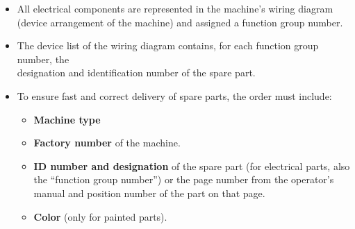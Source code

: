 \begin{itemize}
    \item All electrical components are represented in the machine’s wiring diagram  
          (device arrangement of the machine) and assigned a function group number.
    \item The device list of the wiring diagram contains, for each function group number,  
          the \\designation and identification number of the spare part.
    \item To ensure fast and correct delivery of spare parts, the order must include:
    \begin{itemize}
        \item \textbf{Machine type}
        \item \textbf{Factory number} of the machine.
        \item \textbf{ID number and designation} of the spare part (for electrical parts,  
              also the \enquote{function group number}) or the page number from the  
              operator’s manual and position number of the part on that page.
        \item \textbf{Color} (only for painted parts).
    \end{itemize}
\end{itemize}
